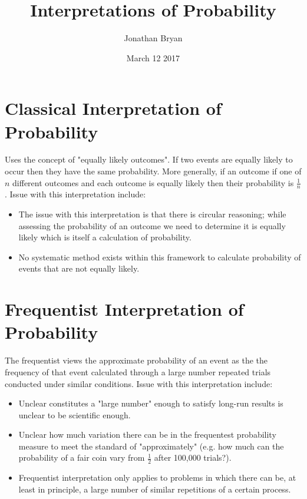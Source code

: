 \documentclass[fleqn]{article}
\title{Interpretations of Probability}
\author{Jonathan Bryan}
\date{March 12 2017}
\begin{document}
\maketitle
\newpage
{}
\section{Classical Interpretation of Probability} 
Uses the concept of "equally likely outcomes". If two events are equally likely to occur then they have the same probability. More generally, if an outcome if one of $n$ different outcomes and each outcome is equally likely then their probability is $\frac{1}{n}$. Issue with this interpretation include:
\begin{itemize}
	\item The issue with this interpretation is that there is circular reasoning; while assessing the probability of an outcome we need to determine it is equally likely which is itself a calculation of probability.
	\item  No systematic method exists within this framework to calculate probability of events that are not equally likely.
\end{itemize}

\section{Frequentist Interpretation of Probability} 
The frequentist views the approximate probability of an event as the the frequency of that event calculated through a large number repeated trials conducted under similar conditions. Issue with this interpretation include:
\begin{itemize}
	\item Unclear  constitutes a "large number" enough to satisfy long-run results is unclear to be scientific enough.
	\item Unclear how much variation there can be in the frequentest probability measure to meet the standard of "approximately" (e.g. how much can the probability of a fair coin vary from $\frac{1}{2}$ after 100,000 trials?).
	\item Frequentist interpretation only applies to problems in which there can be, at least in principle, a large number of similar repetitions of a certain process.
\end{itemize}
\end{document}
